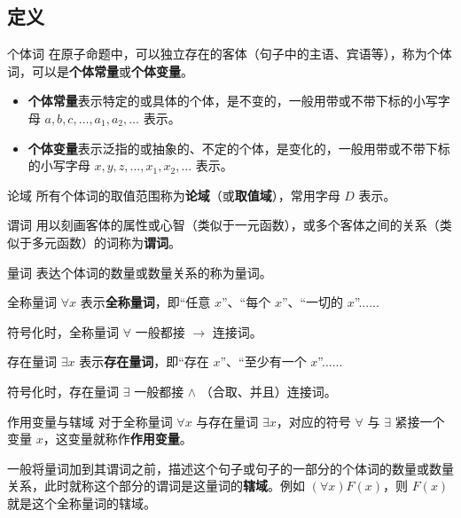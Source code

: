 

\subsection{定义}
\begin{definition}{个体词}
在原子命题中，可以独立存在的客体（句子中的主语、宾语等），称为个体词，可以是\textbf{个体常量}或\textbf{个体变量}。
\begin{itemize}
\item \textbf{个体常量}表示特定的或具体的个体，是不变的，一般用带或不带下标的小写字母 $a, b, c, \dots, a_1, a_2, \dots$ 表示。
\item \textbf{个体变量}表示泛指的或抽象的、不定的个体，是变化的，一般用带或不带下标的小写字母 $x, y, z, \dots, x_1, x_2, \dots$ 表示。
\end{itemize}

\end{definition}
\begin{definition}{论域}
所有个体词的取值范围称为\textbf{论域}（或\textbf{取值域}），常用字母 $D$ 表示。
\end{definition}


\begin{definition}{谓词}
用以刻画客体的属性或心智（类似于一元函数），或多个客体之间的关系（类似于多元函数）的词称为\textbf{谓词}。
\end{definition}

\begin{definition}{量词}
表达个体词的数量或数量关系的称为量词。
\end{definition}

\begin{definition}{全称量词}
$\forall x$ 表示\textbf{全称量词}，即“任意 $x$”、“每个 $x$”、“一切的 $x$”......

符号化时，全称量词 $\forall$ 一般都接 $\to$ 连接词。
\end{definition}
\begin{definition}{存在量词}
$\exists x$ 表示\textbf{存在量词}，即“存在 $x$”、“至少有一个 $x$”......

符号化时，存在量词 $\exists$ 一般都接 $\land$ （合取、并且）连接词。
\end{definition}

\begin{definition}{作用变量与辖域}
对于全称量词 $\forall x$ 与存在量词 $\exists x$，对应的符号 $\forall$ 与 $\exists$ 紧接一个变量 $x$，这变量就称作\textbf{作用变量}。

一般将量词加到其谓词之前，描述这个句子或句子的一部分的个体词的数量或数量关系，此时就称这个部分的谓词是这量词的\textbf{辖域}。例如 $(\forall x) F(x)$，则 $F(x)$ 就是这个全称量词的辖域。
\end{definition}

